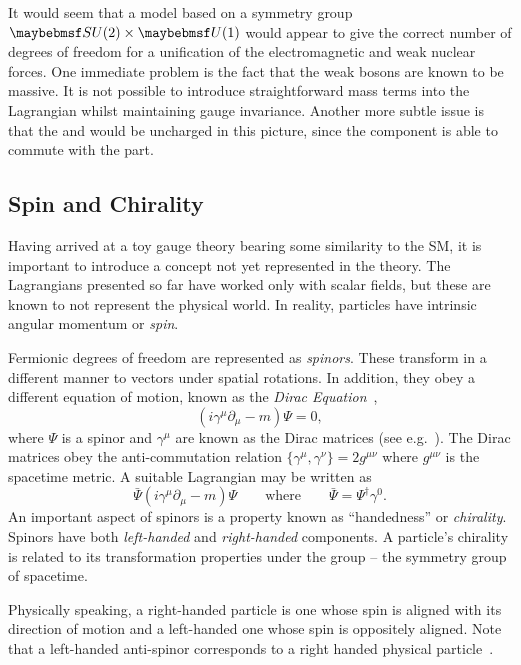 It would seem that a model based on a symmetry group $\SUtwo\times\Uone$ would
appear to give the correct number of degrees of freedom for a unification of the
electromagnetic and weak nuclear forces. One immediate problem is the fact that
the weak bosons are known to be massive. It is not possible to introduce
straightforward mass terms into the Lagrangian whilst maintaining gauge
invariance. Another more subtle issue is that the \PWp and \PWm would be
uncharged in this picture, since the \SUtwo component is able to commute with
the \Uone part.

\subsection{Spin and Chirality}
Having arrived at a toy gauge theory bearing some similarity to the \ac{SM}, it
is important to introduce a concept not yet represented in the theory. The
Lagrangians presented so far have worked only with scalar fields, but these are
known to not represent the physical world. In reality, particles have intrinsic
angular momentum or \emph{spin}.

Fermionic degrees of freedom are represented as \emph{spinors}. These transform
in a different manner to vectors under spatial rotations. In addition, they obey
a different equation of motion, known as the \emph{Dirac
  Equation}~\cite{peskin_schroeder},
\begin{equation*}
\left(i\gamma^\mu \partial_{\mu} - m\right)\Psi = 0,
\end{equation*}
where $\Psi$ is a spinor and $\gamma^{\mu}$ are known as the Dirac matrices (see
e.g.~\cite{aitchison}). The Dirac matrices obey the anti-commutation relation
$\{\gamma^{\mu}, \gamma^{\nu}\} = 2g^{\mu\nu}$ where $g^{\mu\nu}$ is the
spacetime metric. A suitable Lagrangian may be written as
\begin{equation*}
\bar{\Psi} \left (i\gamma^{\mu}\partial_{\mu} -m\right)\Psi \qquad \textrm{where} \qquad \bar{\Psi} =
\Psi^{\dagger}\gamma^0.
\end{equation*}
An important aspect of spinors is a property known as ``handedness'' or
\emph{chirality}. Spinors have both \emph{left-handed} and \emph{right-handed}
components. A particle's chirality is related to its transformation properties
under the \Poincare group -- the symmetry group of spacetime.

Physically speaking, a right-handed particle is one whose spin
is aligned with its direction of motion and a left-handed one whose spin is
oppositely aligned. Note that a left-handed anti-spinor corresponds to a right
handed physical particle~\cite{peskin_schroeder}.

